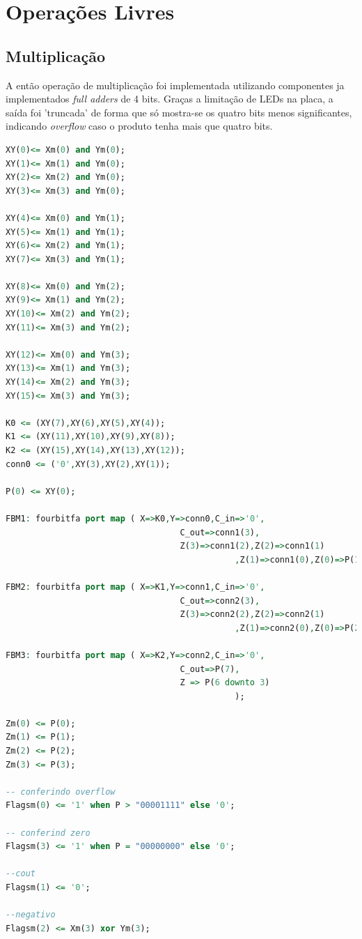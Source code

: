 \documentclass[a4paper, 12pt]{article}
\begin{document}
\section{Operações Livres}

\subsection{Multiplicação}
A então operação de multiplicação foi implementada utilizando componentes ja implementados \textit{full adders} de 4 bits. Graças a limitação de LEDs na placa, a saída foi 'truncada' de forma que só mostra-se os quatro bits menos significantes, indicando \textit{overflow} caso o produto tenha mais que quatro bits.

\begin{lstlisting}[language=VHDL]
XY(0)<= Xm(0) and Ym(0);
XY(1)<= Xm(1) and Ym(0);
XY(2)<= Xm(2) and Ym(0);
XY(3)<= Xm(3) and Ym(0);

XY(4)<= Xm(0) and Ym(1);
XY(5)<= Xm(1) and Ym(1);
XY(6)<= Xm(2) and Ym(1);
XY(7)<= Xm(3) and Ym(1);

XY(8)<= Xm(0) and Ym(2);
XY(9)<= Xm(1) and Ym(2);
XY(10)<= Xm(2) and Ym(2);
XY(11)<= Xm(3) and Ym(2);

XY(12)<= Xm(0) and Ym(3);
XY(13)<= Xm(1) and Ym(3);
XY(14)<= Xm(2) and Ym(3);
XY(15)<= Xm(3) and Ym(3);

K0 <= (XY(7),XY(6),XY(5),XY(4));
K1 <= (XY(11),XY(10),XY(9),XY(8));
K2 <= (XY(15),XY(14),XY(13),XY(12));
conn0 <= ('0',XY(3),XY(2),XY(1));

P(0) <= XY(0);
	 
FBM1: fourbitfa port map ( X=>K0,Y=>conn0,C_in=>'0',
                                   C_out=>conn1(3),
                                   Z(3)=>conn1(2),Z(2)=>conn1(1)
											  ,Z(1)=>conn1(0),Z(0)=>P(1));
											
FBM2: fourbitfa port map ( X=>K1,Y=>conn1,C_in=>'0',
                                   C_out=>conn2(3),
                                   Z(3)=>conn2(2),Z(2)=>conn2(1)
											  ,Z(1)=>conn2(0),Z(0)=>P(2));
											  
FBM3: fourbitfa port map ( X=>K2,Y=>conn2,C_in=>'0',
                                   C_out=>P(7),
                                   Z => P(6 downto 3)
											  );
											  
Zm(0) <= P(0);
Zm(1) <= P(1);
Zm(2) <= P(2);
Zm(3) <= P(3);

-- conferindo overflow								
Flagsm(0) <= '1' when P > "00001111" else '0';

-- conferind zero
Flagsm(3) <= '1' when P = "00000000" else '0';

--cout
Flagsm(1) <= '0';

--negativo
Flagsm(2) <= Xm(3) xor Ym(3);
\end{lstlisting}
\end{document}
